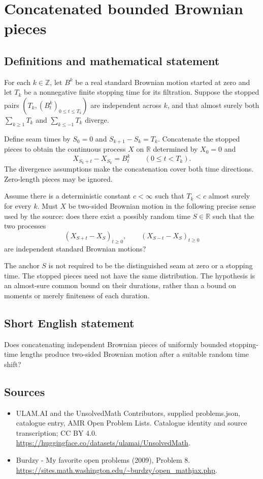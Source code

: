 \documentclass[11pt,a4paper]{article}
\begin{document}
\section*{Concatenated bounded Brownian pieces}\label{statement}

\subsection{Definitions and mathematical statement}
For each $k\in\mathbb Z$, let $B^k$ be a real standard Brownian motion started at zero and let $T_k$ be a nonnegative finite stopping time for its filtration. Suppose the stopped pairs $(T_k,(B^k_t)_{0\le t\le T_k})$ are independent across $k$, and that almost surely both $\sum_{k\ge1}T_k$ and $\sum_{k\le-1}T_k$ diverge.

Define seam times by $S_0=0$ and $S_{k+1}-S_k=T_k$. Concatenate the stopped pieces to obtain the continuous process $X$ on $\mathbb R$ determined by $X_0=0$ and
\[
X_{S_k+t}-X_{S_k}=B^k_t\qquad(0\le t<T_k).
\]
The divergence assumptions make the concatenation cover both time directions. Zero-length pieces may be ignored.

Assume there is a deterministic constant $c<\infty$ such that $T_k<c$ almost surely for every $k$. Must $X$ be two-sided Brownian motion in the following precise sense used by the source: does there exist a possibly random time $S\in\mathbb R$ such that the two processes
\[
(X_{S+t}-X_S)_{t\ge0},\qquad(X_{S-t}-X_S)_{t\ge0}
\]
are independent standard Brownian motions?

The anchor $S$ is not required to be the distinguished seam at zero or a stopping time. The stopped pieces need not have the same distribution. The hypothesis is an almost-sure common bound on their durations, rather than a bound on moments or merely finiteness of each duration.
\subsection{Short English statement}
Does concatenating independent Brownian pieces of uniformly bounded stopping-time lengths produce two-sided Brownian motion after a suitable random time shift?
\subsection{Sources}
\begin{itemize}
\item[S1] ULAM.AI and the UnsolvedMath Contributors, supplied problems.json, catalogue entry, AMR Open Problem Lists. Catalogue identity and source transcription; CC BY 4.0.
\url{https://huggingface.co/datasets/ulamai/UnsolvedMath}.
\item[S2] Burdzy - My favorite open problems (2009), Problem 8. 
\url{https://sites.math.washington.edu/~burdzy/open_mathjax.php}.
\end{itemize}
\end{document}
